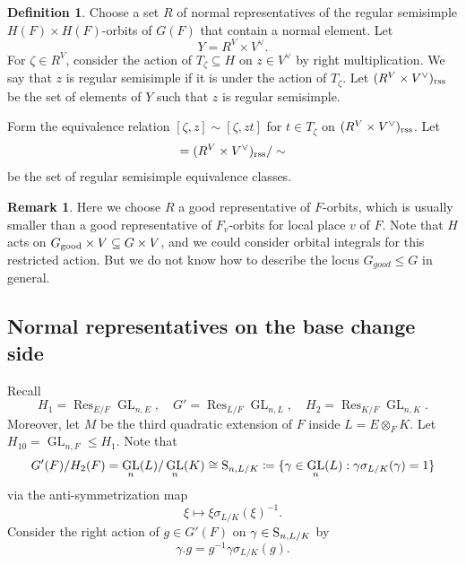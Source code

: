 \documentclass[11pt, reqno]{amsart}
\numberwithin{equation}{subsection}
\theoremstyle{plain}
\theoremstyle{definition}
\newtheorem{definition}[proposition]{Definition}
\newtheorem{remark}[proposition]{Remark}
\renewcommand{\S}{\textnormal{S}}
\DeclareMathOperator{\GL}{GL}
\DeclareMathOperator{\Res}{Res}
\newcommand{\good}{\textnormal{good}}
\newcommand{\rss}{\textnormal{rss}}
\begin{document}
\begin{definition} \label{normal reps: unitary}
Choose a set $R$ of normal representatives of
the regular semisimple $H(F) \times H(F)$-orbits
of $G(F)$ that contain a normal element. Let 
\[
    Y =R^V\times V^\vee.
\]
For $\zeta \in R^V$, consider the action of $T_\zeta \subseteq H$ on $z \in V^\vee$ by right multiplication.  We say that $z$ is regular semisimple if it is under the action of $T_\zeta$.  Let $(R^V\times V^\vee)_\rss$ be the set of elements of $Y$ such that $z$ is regular semisimple. 

Form the equivalence relation 
$[\zeta, z] \sim [\zeta, zt]$ for $t \in T_\zeta$ on $(R^V\times V^\vee)_{\rss}$. Let 
\begin{equation}
[Y_\rss]=(R^V\times V^\vee)_{\rss} / \sim
\end{equation}
be the set of regular semisimple equivalence classes.
\end{definition}




\begin{remark}
Here we choose $R$ a good representative of $F$-orbits, 
which is usually smaller than a good representative of $F_v$-orbits for local place $v$ of $F$. Note that $H$ acts on $G_{\good} \times V \subseteq G \times V$, and we could consider orbital integrals for this restricted action. But we do not know how to describe the locus $G_{good} \leq G$ in general. 
\end{remark}













\subsection{Normal representatives on the base change side} 
Recall 
\[
H_1 = \Res_{E/F} \GL_{n,E}, \quad G' = \Res_{L/F} \GL_{n,L}, \quad H_2 = \Res_{K/F} \GL_{n,K}.
\]
Moreover, let $M$ be the third quadratic extension of $F$ inside $L=E \otimes_F K$. Let $H_{10}=\GL_{n,F} \leq H_1$. Note that 
\[
    G'(F)/H_2(F) = \GL_n(L)/\GL_n(K)  \cong \S_{n,L/K} \coloneqq \{\gamma \in  \GL_{n}(L) : \gamma \sigma_{L/K}(\gamma) = 1\} 
\] 
via the anti-symmetrization map 
\[
    \xi \mapsto \xi\sigma_{L/K}(\xi)^{-1}.
\]
Consider the right action of $g \in G'(F)$ on $\gamma \in \S_{n,L/K}$ by
\begin{equation}
    \gamma.g = g^{-1}\gamma \sigma_{L/K}(g).    
\end{equation}
\end{document}
